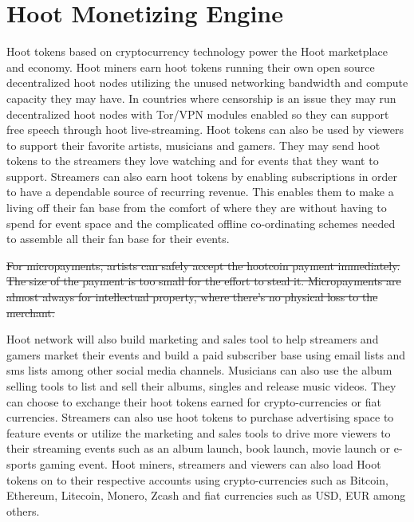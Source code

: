 \documentclass{article}
\begin{document}
\section{Hoot Monetizing Engine}
Hoot tokens based on cryptocurrency technology power the Hoot
marketplace and economy. Hoot miners earn hoot tokens running their own open source
decentralized hoot nodes utilizing the unused networking bandwidth
and compute capacity they may have. In countries where censorship is an issue they
may run decentralized hoot nodes with Tor/VPN modules enabled so they can
support free speech through hoot
live-streaming. Hoot tokens can also be used by viewers to support their favorite artists,
musicians and gamers. They may send hoot tokens to the
streamers they love watching and for events that they want to
support. Streamers can also earn hoot tokens by enabling subscriptions in order to have a
dependable source of recurring revenue. This enables them to make a
living off their fan base from the comfort of where they are without
having to spend for event space and the complicated offline
co-ordinating schemes needed to assemble all their fan base for their events.

\sout{For micropayments, artists can safely accept the hootcoin payment immediately.  The size of the payment is too small for the effort to steal it. Micropayments are almost always for intellectual property, where there's no physical loss to the merchant. }

 Hoot network will also build marketing and sales tool to help
streamers and gamers market their 
events and build a paid subscriber base using email lists and sms lists among other social media
channels. 
Musicians can also use the album selling tools to list and sell
their albums, singles and release music videos. They can
choose to exchange their hoot tokens earned for crypto-currencies or fiat currencies.
 Streamers can also use hoot tokens to
purchase advertising space to feature events or utilize the marketing and sales
tools to drive more viewers to their
streaming events such as an album launch, book launch, movie launch or
e-sports gaming event. Hoot miners, streamers and viewers can also load Hoot
tokens on to their respective accounts using crypto-currencies such as Bitcoin,
Ethereum, Litecoin, Monero, Zcash and fiat currencies such as USD, EUR among others.
\end{document}
